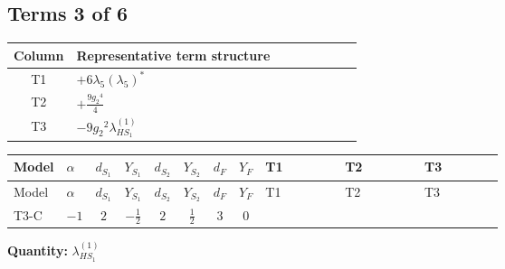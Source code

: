 \documentclass[8pt]{article}
\begin{document}
\begin{landscape}
\subsection*{Terms 3 of 6}
\begin{center}
\begin{tabular}{@{}c >{\raggedright\arraybackslash}p{0.82\linewidth}@{}}
\toprule
Column & Representative term structure \\
\midrule
T1 & \(\displaystyle +6 {\lambda_5} \left({\lambda_5}\right)^{*}\) \\
\midrule
T2 & \(\displaystyle +\frac{9 {g_2}^4}{4}\) \\
\midrule
T3 & \(\displaystyle -9 {g_2}^2 {\lambda_{HS_1}^{(1)}}\) \\
\midrule
\bottomrule
\end{tabular}
\end{center}
\smallskip
\tiny
\begin{longtable}{@{}llcccccc >{\raggedright\arraybackslash}p{0.21\linewidth} >{\raggedright\arraybackslash}p{0.21\linewidth} >{\raggedright\arraybackslash}p{0.21\linewidth}@{}}
\toprule
Model & $\alpha$ & $d_{S_1}$ & $Y_{S_1}$ & $d_{S_2}$ & $Y_{S_2}$ & $d_F$ & $Y_F$ & T1 & T2 & T3 \\
\midrule
\endfirsthead
\toprule
Model & $\alpha$ & $d_{S_1}$ & $Y_{S_1}$ & $d_{S_2}$ & $Y_{S_2}$ & $d_F$ & $Y_F$ & T1 & T2 & T3 \\
\midrule
\endhead
T3-C & $-1$ & $2$ & $-\frac{1}{2}$ & $2$ & $\frac{1}{2}$ & $3$ & $0$ & \scriptsize\adjustbox{max width=\linewidth}{$\begin{gathered} +6 {\lambda_5} \left({\lambda_5}\right)^{*}\end{gathered}$} & \scriptsize\adjustbox{max width=\linewidth}{$\begin{gathered} +\frac{9 {g_2}^4}{4}\end{gathered}$} & \scriptsize\adjustbox{max width=\linewidth}{$\begin{gathered} -9 {g_2}^2 {\lambda_{HS_1}^{(1)}}\end{gathered}$} \\
\midrule
\bottomrule
\end{longtable}
\clearpage
\noindent\textbf{Quantity: }$\lambda_{HS_1}^{(1)}$\par\smallskip

\end{landscape}
\end{document}
